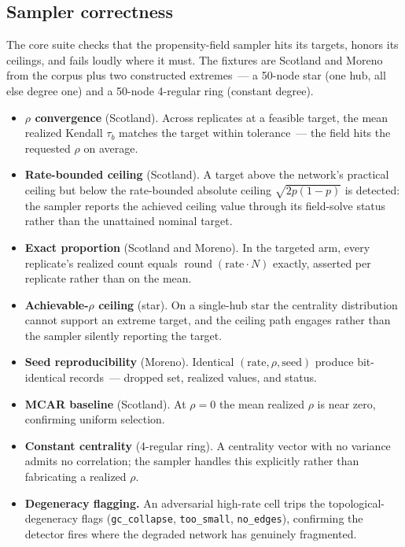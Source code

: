 \documentclass[11pt]{article}
\begin{document}
\subsection{Sampler correctness}

The core suite checks that the propensity-field sampler hits its targets, honors its ceilings, and fails loudly where it must. The fixtures are Scotland and Moreno from the corpus plus two constructed extremes~--- a 50-node star (one hub, all else degree one) and a 50-node 4-regular ring (constant degree).

\begin{itemize}[leftmargin=*, itemsep=3pt]
  \item \textbf{$\rho$ convergence} (Scotland). Across replicates at a feasible target, the mean realized Kendall $\tau_b$ matches the target within tolerance~--- the field hits the requested $\rho$ on average.
  \item \textbf{Rate-bounded ceiling} (Scotland). A target above the network's practical ceiling but below the rate-bounded absolute ceiling $\sqrt{2p(1-p)}$ is detected: the sampler reports the achieved ceiling value through its field-solve status rather than the unattained nominal target.
  \item \textbf{Exact proportion} (Scotland and Moreno). In the targeted arm, every replicate's realized count equals $\operatorname{round}(\text{rate} \cdot N)$ exactly, asserted per replicate rather than on the mean.
  \item \textbf{Achievable-$\rho$ ceiling} (star). On a single-hub star the centrality distribution cannot support an extreme target, and the ceiling path engages rather than the sampler silently reporting the target.
  \item \textbf{Seed reproducibility} (Moreno). Identical $(\text{rate}, \rho, \text{seed})$ produce bit-identical records~--- dropped set, realized values, and status.
  \item \textbf{MCAR baseline} (Scotland). At $\rho = 0$ the mean realized $\rho$ is near zero, confirming uniform selection.
  \item \textbf{Constant centrality} (4-regular ring). A centrality vector with no variance admits no correlation; the sampler handles this explicitly rather than fabricating a realized $\rho$.
  \item \textbf{Degeneracy flagging.} An adversarial high-rate cell trips the topological-degeneracy flags (\texttt{gc\_collapse}, \texttt{too\_small}, \texttt{no\_edges}), confirming the detector fires where the degraded network has genuinely fragmented.

\end{itemize}
\end{document}

